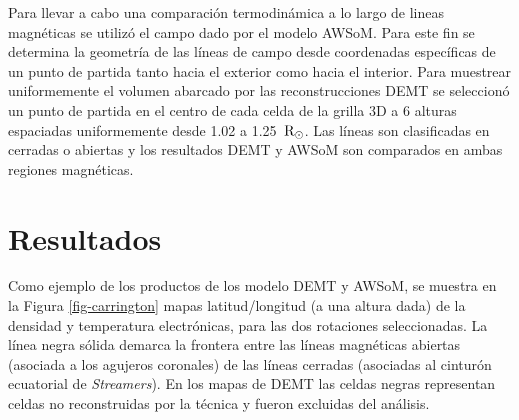 \documentclass[baaa]{baaa}
\begin{document}

Para llevar a cabo una comparación termodinámica a lo largo de lineas magnéticas se utilizó el campo dado por el modelo AWSoM. Para este fin se determina la geometría de las líneas de campo desde coordenadas específicas de un punto de partida tanto hacia el exterior como hacia el interior. Para muestrear uniformemente el volumen abarcado por las reconstrucciones DEMT se seleccionó un punto de partida en el centro de cada celda de la grilla 3D a 6 alturas espaciadas uniformemente desde 1.02 a 1.25 $\,{\rm R_\odot}$. Las líneas son clasificadas en cerradas o abiertas y los resultados DEMT y AWSoM son comparados en ambas regiones magnéticas.





\section{Resultados}
Como ejemplo de los productos de los modelo DEMT y AWSoM, se muestra en la Figura \ref{fig-carrington} mapas latitud/longitud (a una altura dada) de la densidad y temperatura electrónicas, para las dos rotaciones seleccionadas. La línea negra sólida demarca la frontera entre las líneas magnéticas abiertas (asociada a los agujeros coronales) de las líneas cerradas (asociadas al cinturón ecuatorial de \emph{Streamers}). En los mapas de DEMT las celdas negras representan celdas no reconstruidas por la técnica y fueron excluidas del análisis.
\end{document}
